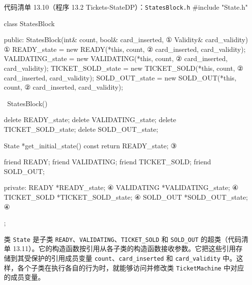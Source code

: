 \begin{codeboxt}{代码清单 13.10（程序 13.2 Tickets-StateDP）：\texttt{States\allowbreak{}Block.\allowbreak{}h}}
#include "State.h"

class StatesBlock
{
public:
    StatesBlock(int& count, bool& card_inserted,             ①
                Validity& card_validity)                     ①
    {
        READY_state = new READY(*this, count,                ②
                                card_inserted,
                                card_validity);
        VALIDATING_state = new VALIDATING(*this, count,      ②
                                          card_inserted,
                                          card_validity);
        TICKET_SOLD_state = new TICKET_SOLD(*this, count,    ②
                                            card_inserted,
                                            card_validity);
        SOLD_OUT_state = new SOLD_OUT(*this, count,          ②
                                      card_inserted,
                                      card_validity);
    }

        ~StatesBlock()

    {
        delete READY_state;
        delete VALIDATING_state;
        delete TICKET_SOLD_state;
        delete SOLD_OUT_state;
    }

    State *get_initial_state() const { return READY_state; } ③

    friend READY;
    friend VALIDATING;
    friend TICKET_SOLD;
    friend SOLD_OUT;

private:
    READY       *READY_state;                                ④
    VALIDATING  *VALIDATING_state;                           ④
    TICKET_SOLD *TICKET_SOLD_state;                          ④
    SOLD_OUT    *SOLD_OUT_state;                             ④
};
\end{codeboxt}
\par
{}\par
{}\par
{}\par

类 \texttt{State} 是子类 \texttt{READY}、\texttt{VALIDATING}、\texttt{TICKET\_\allowbreak{}SOLD} 和 \texttt{SOLD\_OUT} 的超类（代码清单 13.11）。它的构造函数按引用从各子类的构造函数接收参数。它把这些引用存储到其受保护的引用成员变量 \texttt{count}、\texttt{card\_\allowbreak{}inserted} 和 \texttt{card\_\allowbreak{}validity} 中。这样，各个子类在执行各自的行为时，就能够访问并修改类 \texttt{Ticket\allowbreak{}Machine} 中对应的成员变量。

